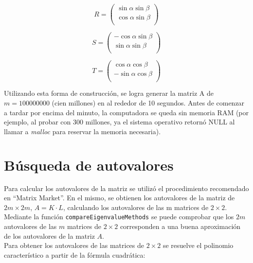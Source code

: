 \documentclass[a4paper,11pt]{article}
\begin{document}
\begin{equation} \label{matrizR}
R =
\left( \begin{array}{cccc}
\sin \alpha \sin \beta\\
\cos \alpha \sin \beta\\
\end{array} \right)
\end{equation}

\begin{equation} \label{matrizS}
S =
\left( \begin{array}{cccc}
-\cos \alpha \sin \beta\\
\sin \alpha \sin \beta\\
\end{array} \right)
\end{equation}

\begin{equation} \label{matrizT}
T =
\left( \begin{array}{cccc}
\cos \alpha \cos \beta\\
-\sin \alpha \cos \beta\\
\end{array} \right)
\end{equation}

Utilizando esta forma de construcción, se logra generar la matriz A de $m =
100000000$ (cien millones) en al rededor de 10 segundos. Antes de comenzar a
tardar por encima del minuto, la computadora se queda sin memoria RAM (por ejemplo,
al probar con 300 millones, ya el sistema operativo retorn\'o NULL al llamar
a \emph{malloc} para reservar la memoria necesaria).

\newpage
\section{B\'usqueda de autovalores}
Para calcular los autovalores de la matriz se utiliz\'o el procedimiento
recomendado en ``Matrix Market''. En el mismo, se obtienen los autovalores de la
matriz de $2m \times 2m$, $A = K \cdot L$, calculando los autovalores de las m matrices de
$2 \times 2$. \\

Mediante la funci\'on \verb+compareEigenvalueMethods+ se puede comprobar que los $2m$
autovalores de las $m$ matrices de $2 \times 2$ corresponden a una buena
aproximación de los autovalores de la matriz $A$. \\

Para obtener los autovalores de las matrices de $2 \times 2$ se resuelve el polinomio
característico a partir de la fórmula cuadrática:
\end{document}
